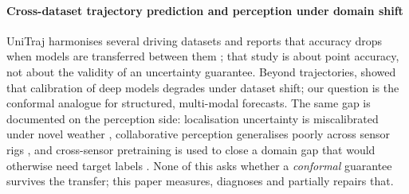 \paragraph{Cross-dataset trajectory prediction and perception under domain shift}
UniTraj harmonises several driving datasets and reports that accuracy drops when models are transferred between them
\cite{feng2024unitraj}; that study is about point accuracy, not about the validity of an uncertainty guarantee.
Beyond trajectories, \cite{ovadia2019can} showed that calibration of deep models degrades under dataset shift; our
question is the conformal analogue for structured, multi-modal forecasts. The same gap is documented on the perception
side: localisation uncertainty is miscalibrated under novel weather \cite{wu2025visuallocalization}, collaborative
perception generalises poorly across sensor rigs \cite{wang2025collaborative}, and cross-sensor pretraining is used to
close a domain gap that would otherwise need target labels \cite{kong2025largead,qiu2026crosssensor}. None of this asks
whether a \emph{conformal} guarantee survives the transfer; this paper measures, diagnoses and partially repairs that.
